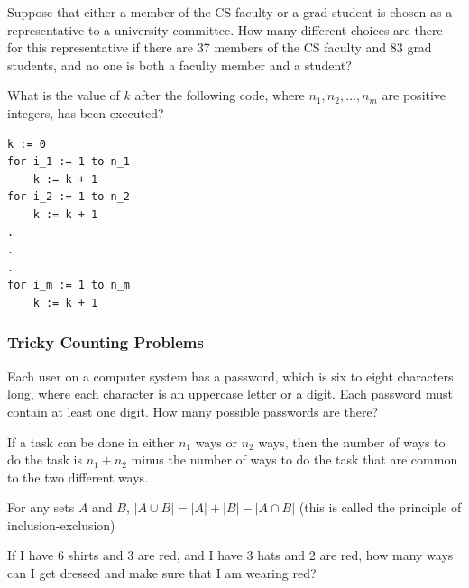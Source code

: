 \begin{exmp}
    Suppose that either a member of the CS faculty or a grad student is chosen as a representative to a university committee. How many different choices are there for this representative if there are 37 members of the CS faculty and 83 grad students, and no one is both a faculty member and a student?

    \vspace{2cm}
\end{exmp}

\newpage
\begin{exmp}
    What is the value of $k$ after the following code, where $n_1, n_2, \ldots, n_m$ are positive integers, has been executed?

    \begin{verbatim}
k := 0
for i_1 := 1 to n_1
    k := k + 1
for i_2 := 1 to n_2
    k := k + 1
.
.
.
for i_m := 1 to n_m
    k := k + 1
\end{verbatim}
\vspace{2cm}
\end{exmp}
\subsubsection{Tricky Counting Problems}
\begin{exmp}
    Each user on a computer system has a password, which is six to eight characters long, where each character is an uppercase letter or a digit. Each password must contain at least one digit. How many possible passwords are there?
    \vspace{4cm}
\end{exmp}

\begin{defn}
    If a task can be done in either $n_1$ ways or $n_2$ ways, then the number of ways to do the task is $n_1 + n_2$ minus the number of ways to do the task that are common to the two different ways.
\end{defn}
\begin{exmp}
For any sets $A$ and $B$,
$|A\cup B|=|A|+|B|-|A\cap B|$ (this is called the principle of inclusion-exclusion)
\end{exmp}
\begin{exmp}
If I have 6 shirts and 3 are red, and I have 3 hats and 2 are  red, how many ways can I get dressed and make sure that I am wearing red?
\vspace{2cm}
\end{exmp}

